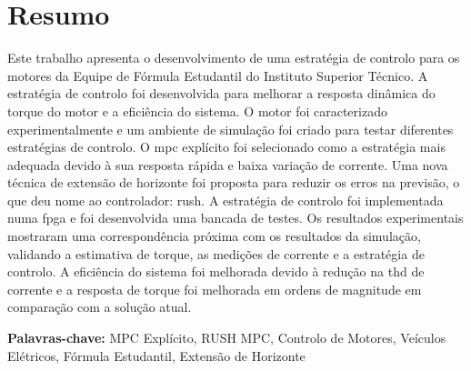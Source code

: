 
\section*{Resumo}


Este trabalho apresenta o desenvolvimento de uma estratégia de controlo para os motores da Equipe de Fórmula Estudantil do Instituto Superior Técnico. A estratégia de controlo foi desenvolvida para melhorar a resposta dinâmica do torque do motor e a eficiência do sistema. O motor foi caracterizado experimentalmente e um ambiente de simulação foi criado para testar diferentes estratégias de controlo. O \gls{mpc} explícito foi selecionado como a estratégia mais adequada devido à sua resposta rápida e baixa variação de corrente. Uma nova técnica de extensão de horizonte foi proposta para reduzir os erros na previsão, o que deu nome ao controlador: \acrfull{rush}. A estratégia de controlo foi implementada numa \gls{fpga} e foi desenvolvida uma bancada de testes. Os resultados experimentais mostraram uma correspondência próxima com os resultados da simulação, validando a estimativa de torque, as medições de corrente e a estratégia de controlo. A eficiência do sistema foi melhorada devido à redução na \gls{thd} de corrente e a resposta de torque foi melhorada em ordens de magnitude em comparação com a solução atual.

\vfill

\textbf{\Large Palavras-chave:} MPC Explícito, RUSH MPC, Controlo de Motores, Veículos Elétricos, Fórmula Estudantil, Extensão de Horizonte

